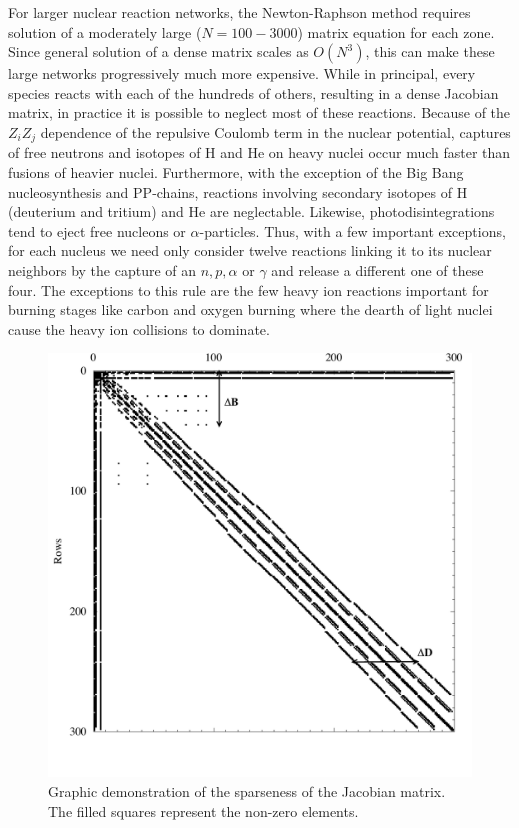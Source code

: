 \documentclass[12pt,modern,tighten,times,apj]{aastex61}
\newcommand{\alp}{\ensuremath{\alpha}}
\begin{document}
For larger nuclear reaction networks, the Newton-Raphson method requires solution of a moderately large ($N=100-3000$) matrix equation for each zone.  
Since general solution of a dense matrix scales as $O(N^{3})$, this can make these large networks progressively much more expensive.  
While in principal, every species reacts with each of the hundreds of others, resulting in a dense Jacobian matrix, 
in practice it is possible to neglect most of these reactions.  Because of 
the $Z_{i}Z_{j}$ dependence of the repulsive Coulomb term in the nuclear 
potential, captures of free neutrons and isotopes of H and He on heavy 
nuclei occur much faster than fusions of heavier nuclei.  Furthermore, with 
the exception of the Big Bang nucleosynthesis and PP-chains, reactions 
involving secondary isotopes of H (deuterium and tritium) and He are 
neglectable.  Likewise, photodisintegrations tend to eject free nucleons or 
\alp-particles.  Thus, with a few important exceptions, for each nucleus we 
need only consider twelve reactions linking it to its nuclear neighbors by the 
capture of an $n,p,\alpha$ or $\gamma$ and release a different one of these 
four.  The exceptions to this rule are the few heavy ion reactions important 
for burning stages like carbon and oxygen burning where the dearth of light 
nuclei cause the heavy ion collisions to dominate.

\begin{figure}
    \begin{center}
 	    \includegraphics[width=.6\textwidth]{sparse}
    \end{center}
	\caption{Graphic demonstration of the sparseness of the Jacobian
	matrix.  The filled squares represent the non-zero elements.}
    \label{fig:sparse} 
\end{figure}
\end{document}
